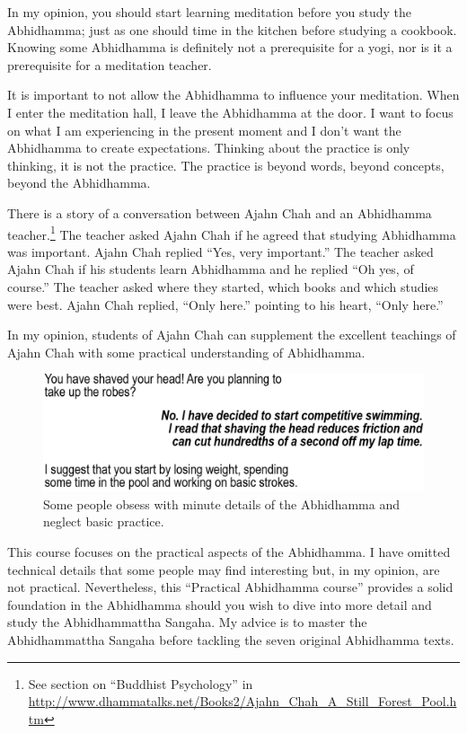 \color{red}


In my opinion, you should start learning meditation before you study the Abhidhamma; just as one should time in the kitchen before studying a cookbook. Knowing some Abhidhamma is definitely not a prerequisite for a yogi, nor is it a prerequisite for a meditation teacher.

It is important to not allow the Abhidhamma to influence your meditation. When I enter the meditation hall, I leave the Abhidhamma at the door. I want to focus on what I am experiencing in the present moment and I don’t want the Abhidhamma to create expectations. Thinking about the practice is only thinking, it is not the practice. The practice is beyond words, beyond concepts, beyond the Abhidhamma. 

There is a story of a conversation between Ajahn Chah and an Abhidhamma teacher.\footnote{See section on “Buddhist Psychology” in \url{http://www.dhammatalks.net/Books2/Ajahn_Chah_A_Still_Forest_Pool.htm}} The teacher asked Ajahn Chah if he agreed that studying Abhidhamma was important. Ajahn Chah replied  “Yes, very important.” The teacher asked Ajahn Chah if his students learn Abhidhamma and he replied  “Oh yes, of course.” The teacher asked where they started, which books and which studies were best. Ajahn Chah replied, “Only here.” pointing to his heart, “Only here.”

In my opinion, students of Ajahn Chah can supplement the excellent teachings of Ajahn Chah with some practical understanding of Abhidhamma. 

\color{black}

\begin{figure}[H]
\centering
\includegraphics[width=0.7\linewidth]{./Diagrams/Swimming}
\caption{Some people obsess with minute details of the Abhidhamma and neglect basic practice.}
\label{fig:Swimming}
\end{figure}

This course focuses on the practical aspects of the Abhidhamma. I have omitted technical details that some people may find interesting but, in my opinion, are not practical. \color{red} Nevertheless, this “Practical Abhidhamma course” provides a solid foundation in the Abhidhamma should you wish to dive into more detail and study the Abhidhammattha Sangaha. My advice is to master the Abhidhammattha Sangaha before tackling the seven original Abhidhamma texts.

